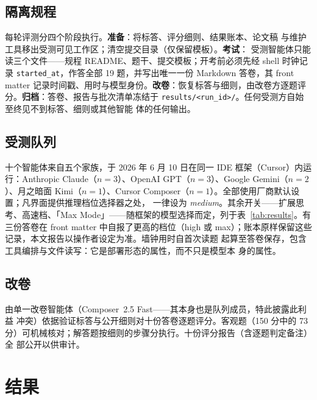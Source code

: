 \documentclass[11pt,UTF8]{ctexart}
\theoremstyle{definition}
\begin{document}
\subsection{隔离规程}

每轮评测分四个阶段执行。\textbf{准备}：将标答、评分细则、结果账本、论文稿
与维护工具移出受测可见工作区；清空提交目录（仅保留模板）。\textbf{考试}：
受测智能体只能读三个文件——规程 README、题干、提交模板；开考前必须先经
shell 时钟记录 \texttt{started\_at}，作答全部 19 题，并写出唯一一份
Markdown 答卷，其 front matter
记录时间戳、用时与模型身份。\textbf{改卷}：恢复标答与细则，由改卷方逐题评
分。\textbf{归档}：答卷、报告与批次清单冻结于
\texttt{results/<run\_id>/}。任何受测方自始至终见不到标答、细则或其他智能
体的任何输出。

\subsection{受测队列}

十个智能体来自五个家族，于 2026 年 6 月 10 日在同一 IDE
框架（Cursor）内运行：Anthropic Claude（$n{=}3$）、OpenAI
GPT（$n{=}3$）、Google Gemini（$n{=}2$）、月之暗面
Kimi（$n{=}1$）、Cursor
Composer（$n{=}1$）。全部使用厂商默认设置；凡界面提供推理档位选择器之处，
一律设为 \emph{medium}。其余开关——扩展思考、高速档、「Max
Mode」——随框架的模型选择而定，列于表~\ref{tab:results}。有三份答卷在
front matter 中自报了更高的档位（high 或
max）；账本原样保留这些记录，本文报告以操作者设定为准。墙钟用时自首次读题
起算至答卷保存，包含工具编排与文件读写：它是部署形态的属性，而不只是模型本
身的属性。

\subsection{改卷}

由单一改卷智能体（Composer~2.5 Fast——其本身也是队列成员，特此披露此利益
冲突）依据验证标答与公开细则对十份答卷逐题评分。客观题（150 分中的 73
分）可机械核对；解答题按细则的步骤分执行。十份评分报告（含逐题判定备注）全
部公开以供审计。

\section{结果}
\label{sec:results}
\end{document}
